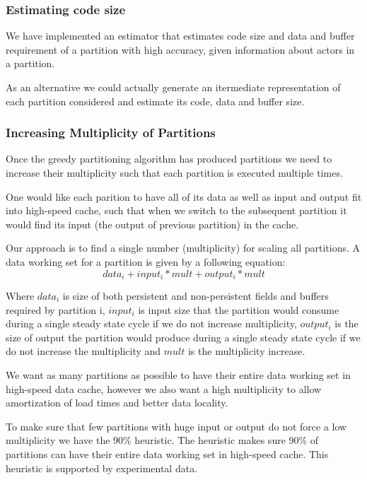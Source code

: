 \documentclass{sig-alternate}
\begin{document}
\subsubsection{Estimating code size}

We have implemented an estimator that estimates code size and
data and buffer requirement of a partition with high accuracy, 
given information about actors in a partition.

As an alternative we could actually generate an itermediate 
representation of each partition considered and estimate its
code, data and buffer size.

\subsubsection{Increasing Multiplicity of Partitions}

Once the greedy partitioning algorithm has produced partitions
we need to increase their multiplicity such that each partition
is executed multiple times.

One would like each parition to have all of its data
as well as input and output fit into high-speed cache, such that
when we switch to the subsequent partition it would find its
input (the output of previous partition) in the cache.

Our approach is to find a single number (multiplicity) for scaling
all partitions. A data working set for a partition is given
by a following equation:
\begin{equation}
data_i + input_i * mult + output_i * mult
\end{equation}

Where $data_i$ is size of both persistent and non-persistent
fields and buffers required by partition i, 
$input_i$ is input size that the partition would consume during a 
single steady state cycle if we do not increase multiplicity, 
$output_i$ is the size of output the partition would produce 
during a single steady state cycle if we do not increase the 
multiplicity
and $mult$ is the multiplicity increase.

We want as many partitions as possible to have their entire
data working set in high-speed data cache, however we also
want a high multiplicity to allow amortization of load times
and better data locality.

To make sure that few partitions with huge input or output
do not force a low multiplicity we have the 90\% heuristic.
The heuristic makes sure 90\% of partitions can have their entire 
data working set in high-speed cache. This heuristic is 
supported by experimental data.
\end{document}
